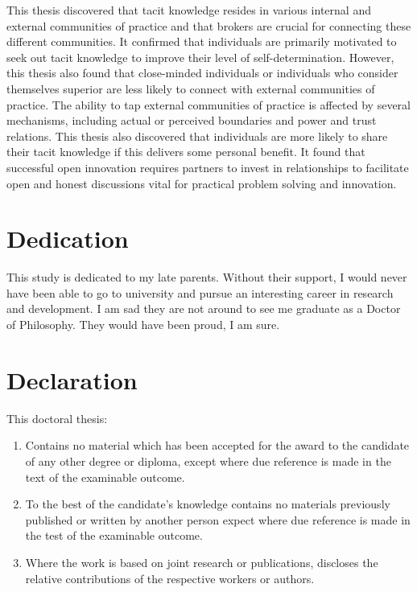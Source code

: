 \documentclass[12pt,table,xcdraw]{book}
\begin{document}
This thesis discovered that tacit knowledge resides in various internal and external communities of practice and that brokers are crucial for connecting these different communities. It confirmed that individuals are primarily motivated to seek out tacit knowledge to improve their level of self-determination. However, this thesis also found that close-minded individuals or individuals who consider themselves superior are less likely to connect with external communities of practice. The ability to tap external communities of practice is affected by several mechanisms, including actual or perceived boundaries and power and trust relations. This thesis also discovered that individuals are more likely to share their tacit knowledge if this delivers some personal benefit. It found that successful open innovation requires partners to invest in relationships to facilitate open and honest discussions vital for practical problem solving and innovation.

\chapter*{Dedication}

This study is dedicated to my late parents. Without their support, I would never have been able to go to university and pursue an interesting career in research and development. I am sad they are not around to see me graduate as a Doctor of Philosophy. They would have been proud, I am sure.

\chapter*{Declaration}

This doctoral thesis:

\begin{enumerate}
    \item Contains no material which has been accepted for the award to the candidate of any other degree or diploma, except where due reference is made in the text of the examinable outcome.
    \item To the best of the candidate’s knowledge contains no materials previously published or written by another person expect where due reference is made in the test of the examinable outcome.
    \item Where the work is based on joint research or publications, discloses the relative contributions of the respective workers or authors.
\end{enumerate} \bigskip
\end{document}
